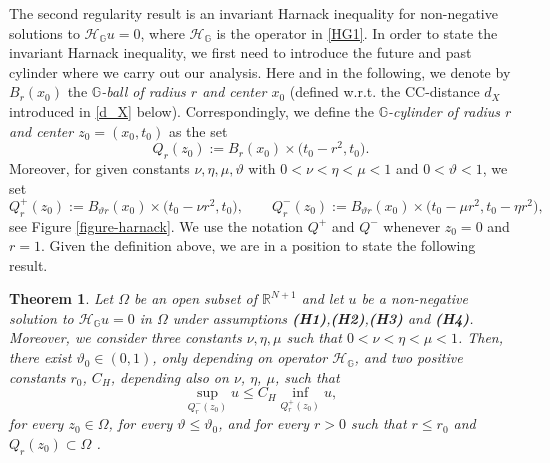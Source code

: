 \documentclass[11pt,a4paper]{article}
\newtheorem{theorem}{\bf Theorem}[section]
\numberwithin{equation}{section}
\newcommand{\R}{\mathbb{R}}
\def \GG {{\mathbb{G}}}
\def \H {\mathscr{H}_\GG}
\def \y {{\eta}}
\begin{document}
{The second regularity result is an invariant Harnack inequality for non-negative solutions to $\H u =0$, where $\H$ is the operator in \eqref{HG1}. In order to state the invariant Harnack inequality, we first need to introduce the future and past cylinder where we carry out our analysis. Here and in the following, we denote by $B_r(x_0)$ the \textit{$\GG$-ball of radius $r$ and center $x_0$} (defined w.r.t. the CC-distance $d_X$ introduced in \eqref{d_X} below). Correspondingly, we define the \emph{$\GG$-cylinder of radius $r$ and center $z_0=(x_0,t_0)$} as the set
\begin{equation}
	Q_r(z_0):=B_r(x_0)\times \Big(t_0-r^2,t_0\Big).
\end{equation}
Moreover, for given constants $\nu, \y, \mu, \vartheta$ with $0 < \nu < \y < \mu < 1$ and $0 < \vartheta < 1$, 
we set 
\begin{equation}
	\label{unit-box+-}
	 Q_r^+(z_0) := B_{\vartheta r}(x_0) \times \Big(t_0-\nu r^2,t_0\Big), \qquad 
	 Q_r^-(z_0) := B_{\vartheta r}(x_0) \times \Big(t_0-\mu r^2,t_0-\y r^2\Big),
\end{equation}
see Figure \ref{figure-harnack}. We use the notation $Q^+$ and $Q^-$ whenever $z_0=0$ and $r=1$. Given the definition above, we are in a position to state the following result.
\begin{theorem}\label{Th-Harnack}
Let $\Omega$ be an open subset of $\R^{N+1}$ and let $u$ be a non-negative solution to $\H u =0$ in $\Omega $ under assumptions \textbf{(H1)},\textbf{(H2)},\textbf{(H3)} and \textbf{(H4)}.  Moreover, we consider three constants $\nu, \y, \mu$ such that $0 < \nu < \eta < \mu < 1$. Then, there exist $\vartheta_0\in (0,1)$, only depending on operator $\H$, and two positive constants $r_0$, $C_H$, depending also on $\nu$, $\eta$, $\mu$, such that
\begin{equation}\label{eq:thm-harnack}
\sup_{Q^{-}_{r}(z_0)}u \leq C_H \inf_{Q^{+}_{r}(z_0)}u,
\end{equation}
for every $z_0 \in \Omega$, for every $\vartheta\leq \vartheta_0$, and for every $r >0$ such that $r \leq r_0$ and $Q_r(z_0) \subset \Omega$ .
\end{theorem}
}
\end{document}
